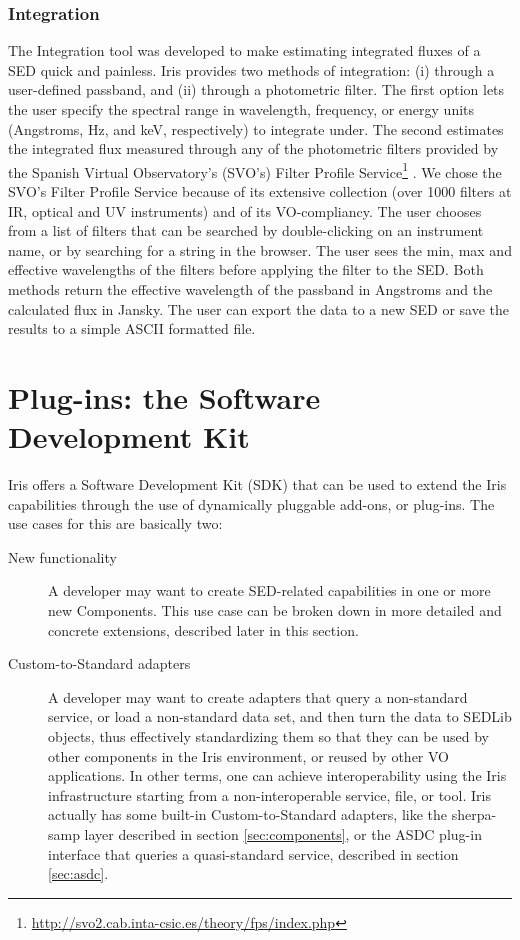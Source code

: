 \documentclass[final,5p,authoryear]{elsarticle}
\begin{document}
\subsubsection{Integration} The Integration tool was developed to make
estimating integrated fluxes of a SED quick and painless. Iris provides two
methods of integration: (i) through a user-defined passband, and (ii) through a
photometric filter. The first option lets the user specify the spectral range in
wavelength, frequency, or energy units (Angstroms, Hz, and keV, respectively) to
integrate under. The second estimates the integrated flux measured through any
of the photometric filters provided by the Spanish Virtual Observatory's (SVO's)
Filter Profile
Service\footnote{\url{http://svo2.cab.inta-csic.es/theory/fps/index.php}}
\citep{2013arXiv1312.3249S}. We chose the SVO's Filter Profile Service because
of its extensive collection (over 1000 filters at IR, optical and UV
instruments) and of its VO-compliancy. The user chooses from a list of filters
that can be searched by double-clicking on an instrument name, or by searching
for a string in the browser. The user sees the min, max and effective
wavelengths of the filters before applying the filter to the SED.
Both methods return the effective wavelength of the passband in Angstroms and
the calculated flux in Jansky. The user can export the data to a new SED or
save the results to a simple ASCII formatted file.

\section{Plug-ins: the Software Development Kit} \label{sec:plugins}

Iris offers a Software Development Kit (SDK) that can be used to extend the Iris
capabilities through the use of dynamically pluggable add-ons, or plug-ins.  The
use cases for this are basically two: \begin{description} \item[New
functionality] A developer may want to create SED-related capabilities in one or
more new Components. This use case can be broken down in more detailed and
concrete extensions, described later in this section.  \item[Custom-to-Standard
adapters] A developer may want to create adapters that query a non-standard
service, or load a non-standard data set, and then turn the data to SEDLib
objects, thus effectively standardizing them so that they can be used by other
components in the Iris environment, or reused by other VO applications. In other
terms, one can achieve interoperability using the Iris infrastructure starting
from a non-interoperable service, file, or tool. Iris actually has some built-in
Custom-to-Standard adapters, like the sherpa-samp layer described in section
\ref{sec:components}, or the ASDC plug-in interface that queries a
quasi-standard service, described in section \ref{sec:asdc}.  \end{description}
\end{document}

